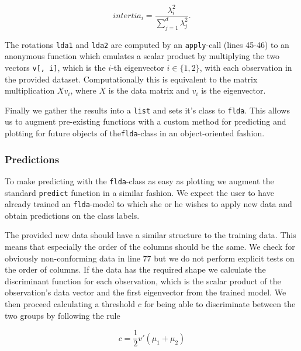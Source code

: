 \documentclass{article}
\begin{document}
\begin{equation}
intertia_i = \frac{\lambda_i^2}{\sum_{j=1}^{d}\lambda_{j}^{2}}.
\end{equation}

The rotations \texttt{lda1} and \texttt{lda2} are computed by an \texttt{apply}-call (lines 45-46) to an anonymous function which emulates a scalar product by multiplying the two vectors \texttt{v[, i]}, which is the $i$-th eigenvector $i \in \{1, 2\}$, with each observation in the provided dataset. Computationally this is equivalent to the matrix multiplication $Xv_i$, where $X$ is the data matrix and $v_i$ is the eigenvector.

Finally we gather the results into a \texttt{list} and sets it's class to \texttt{flda}. This allows us to augment pre-existing functions with a custom method for predicting and plotting for future objects of the\texttt{flda}-class in an object-oriented fashion.

\subsubsection{Predictions}

To make predicting with the \texttt{flda}-class as easy as plotting we augment the standard \texttt{predict} function in a similar fashion. We expect the user to have already trained an \texttt{flda}-model to which she or he wishes to apply new data and obtain predictions on the class labels. 



The provided new data should have a similar structure to the training data. This means that especially the order of the columns should be the same. We check for obviously non-conforming data in line 77 but we do not perform explicit tests on the order of columns. If the data has the required shape we calculate the discriminant function for each observation, which is the scalar product of the observation's data vector and the first eigenvector from the trained model. We then proceed calculating a threshold $c$ for being able to discriminate between the two groups by following the rule

\begin{equation}
c = \frac{1}{2} v \prime \left(\mu_1 + \mu_2\right) 
\end{equation}
\end{document}
